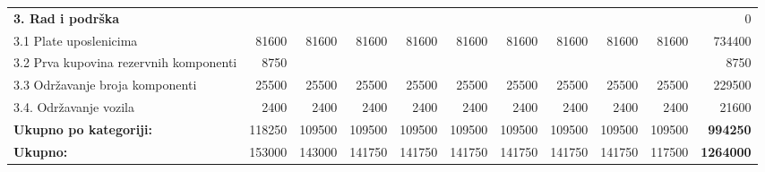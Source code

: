 \documentclass[12pt]{article}
\begin{document}
\begin{landscape}
\begin{table}[htbp]
\begin{tabular}{lrrrrrrrrrr}
    \midrule
    \textbf{3. Rad i podrška} &       &       &       &       &       &       &       &       &       & 0 \\
    3.1 Plate uposlenicima & 81600 & 81600 & 81600 & 81600 & 81600 & 81600 & 81600 & 81600 & 81600 & 734400 \\
    \multicolumn{1}{p{14.715em}}{3.2 Prva kupovina rezervnih\newline{} komponenti} & 8750  &       &       &       &       &       &       &       &       & 8750 \\
    3.3 Održavanje broja komponenti & 25500 & 25500 & 25500 & 25500 & 25500 & 25500 & 25500 & 25500 & 25500 & 229500 \\
    3.4. Održavanje vozila & 2400  & 2400  & 2400  & 2400  & 2400  & 2400  & 2400  & 2400  & 2400  & 21600 \\
    \midrule
    \textbf{Ukupno po kategoriji:} & 118250 & 109500 & 109500 & 109500 & 109500 & 109500 & 109500 & 109500 & 109500 & \textbf{994250} \\
    \midrule
    \textbf{Ukupno:} & 153000 & 143000 & 141750 & 141750 & 141750 & 141750 & 141750 & 141750 & 117500 & \textbf{1264000} \\

    \bottomrule
    \end{tabular}%
  \label{rj1_50}%
\end{table}%

\end{landscape}
\end{document}
